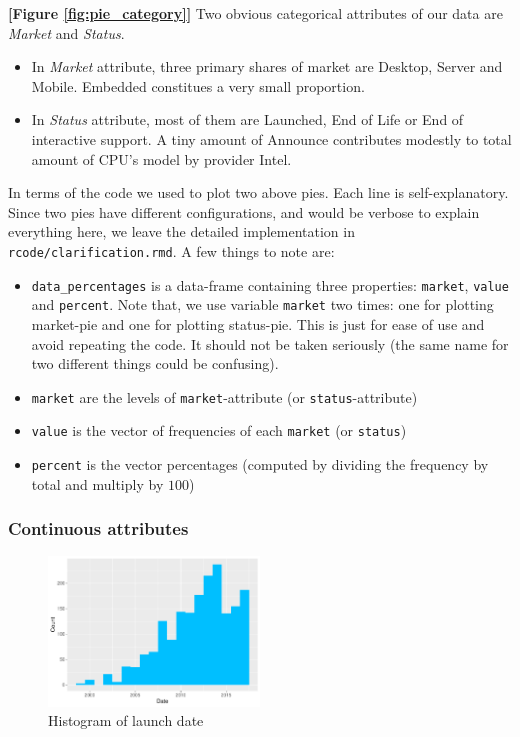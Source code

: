 \textbf{[Figure \ref{fig:pie_category}]} Two obvious categorical attributes of our data are \textit{Market} and \textit{Status}.
\begin{itemize}
    \item In \textit{Market} attribute, three primary shares of market are Desktop, Server and Mobile. Embedded constitues a very small
    proportion.
    \item In \textit{Status} attribute, most of them are Launched, End of Life or End of interactive support. A tiny amount of Announce
    contributes modestly to total amount of CPU's model by provider Intel.
\end{itemize}

In terms of the code we used to plot two above pies. Each line is self-explanatory. Since two pies have different configurations, and would be
verbose to explain everything here, we leave the detailed implementation in \verb|rcode/clarification.rmd|. A few things to note are:
\begin{itemize}
    \item \verb|data_percentages| is a data-frame containing three properties: \verb|market|, \verb|value| and \verb|percent|.
    Note that, we use variable \verb|market| two times: one for plotting market-pie and one for plotting status-pie. This is just for ease
    of use and avoid repeating the code. It should not be taken seriously (the same name for two different things could be confusing).
    \item \verb|market| are the levels of \verb|market|-attribute (or \verb|status|-attribute)
    \item \verb|value| is the vector of frequencies of each \verb|market| (or \verb|status|)
    \item \verb|percent| is the vector percentages (computed by dividing the frequency by total and multiply by $100$)
\end{itemize}





\subsubsection{Continuous attributes}

\begin{figure}[H]
    \centering
    \includegraphics[width=0.5\textwidth]{./graphics/hist_ldate.pdf}
    \caption{Histogram of launch date}
    \label{fig:hist_ldate}
\end{figure}


